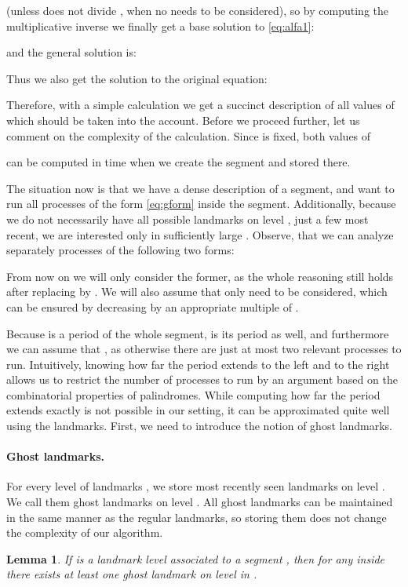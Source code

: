 \documentclass{article}[11pt,letter]
\newtheorem{lemma}[definition]{Lemma}
\begin{document}
(unless  does not divide , when no  needs to be considered), so by computing the multiplicative inverse we finally get
a base solution to \eqref{eq:alfa1}:

and the general solution is:

Thus we also get the solution to the original equation:


Therefore, with a simple calculation we get a succinct description of all values of  which should be taken into the account.
Before we proceed further, let us comment on the complexity of the calculation. Since  is fixed, both values of

can be computed in  time when we create the segment and stored there.

The situation now is that we have a dense description of a segment, and want to run all processes  of the form \eqref{eq:gform}
inside the segment. Additionally, because we do not necessarily have all possible landmarks on level , just a few most recent,
we are interested only in sufficiently large . Observe, that we can analyze separately processes of the following two forms:

From now on we will only consider the former, as the whole reasoning still holds after replacing  by . We will also assume
that only  need to be considered, which can be  ensured by decreasing  by an appropriate multiple of
.

Because  is a period of the whole segment,  is its period as well, and furthermore we can assume that
, as otherwise there are just at most two relevant processes to run.
Intuitively, knowing how far the period extends to the left and to the right allows us to restrict the number of processes to run
by an argument based on the combinatorial properties of palindromes.
While computing how far the period extends exactly is not possible in our setting, it can be approximated quite well using the landmarks.
First, we need to introduce the notion of ghost landmarks.

\paragraph{Ghost landmarks.} For every level of landmarks , we store  most recently seen
landmarks on level . We call them ghost landmarks on level . All ghost landmarks can be maintained in the
same manner as the regular landmarks, so storing them does not change the complexity of our algorithm.

\begin{lemma}
\label{lem:using ghosts}
If  is a landmark level associated to a segment , then for any  inside  there exists at least one ghost landmark on
level  in .
\end{lemma}
\end{document}
